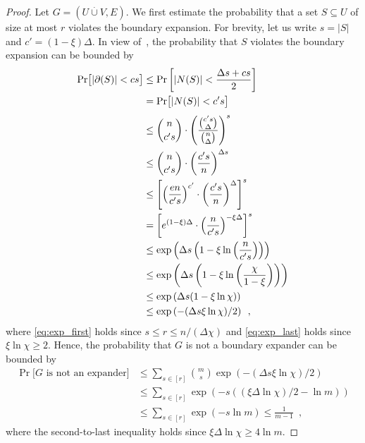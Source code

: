 \documentclass{article}
\newcommand{\PROB}[2][]{\Pr_{#1} \left[ #2 \right]}
\newcommand{\Prob}[2][]{\Pr_{#1} \bigl[ #2 \bigr]}
\newcommand{\boundary}[1]{\ensuremath{\partial #1}}
\newcommand{\setsize}[1]{\lvert#1\rvert}
\newcommand{\disjointunion}{\overset{.}{\cup}}
\newcommand{\eqcomma}{\enspace ,}
\newcommand{\numpigeons}{m}
\newcommand{\numholes}{n}
\newcommand{\uniqueNeigh}[2][]{\boundary_{{#1}} ({#2})}
\newcommand{\diff}{\xi}
\newcommand{\GdegMax}{\Delta}
\newcommand{\gdegmax}{\GdegMax}
\numberwithin{equation}{section}
\begin{document}
\begin{proof}
  Let $G= (U \disjointunion V, E)$. We 
  first estimate the probability 
  that a set $S \subseteq U$ of size at most $r$ violates 
  the boundary expansion. 
  For brevity, let us write
  $s = \setsize{ S }$
  and $c' = (1 - \diff)\GdegMax$.
  In view of~, 
  the probability that $S$ violates the boundary expansion
  can be bounded by
  \begin{subequations}
  \begin{align}
    \Prob{ \setsize{ \uniqueNeigh{S} } < cs } 
    &\le \PROB{ \setsize{ N(S) } < \frac{\GdegMax s + cs}{2}  }\\
    &= \Prob{ \setsize{ N(S) } < c's  }\\
    &\leq
      \binom{\numholes}{ c's } \cdot
      \left(
      \frac
      {\binom{c' s}{\gdegmax}}
      {\binom{\numholes}{\gdegmax}}
      \right)^s \\
    &\le  \binom{\numholes}{c's}  \cdot
    \left( \frac{ c's }{\numholes} \right)^{\GdegMax s}\\
    &\le 
     \left[
     \left( \frac{e\numholes}{c's} \right)^{c'} \cdot
     \left( \frac{c's}{\numholes} \right)^{\GdegMax}
     \right]^s
    \\
    &= 
    \left[
    {e}^{(1-\diff)\GdegMax} \cdot
    \left( \frac{\numholes}{c' s} \right)^{-\diff \GdegMax }
    \right]^s\\
    &\le \exp \left(\GdegMax s \left(1 -\diff \ln \left(\frac{\numholes}{c's}\right)\right) \right)\\ \label{eq:exp_first}
    &\le \exp \left(\GdegMax s \left(1 -\diff \ln \left(\frac{\chi}{1-\diff}\right)\right) \right)\\
    &\le \exp \left(\GdegMax s (1 -\diff \ln {\chi}) \right)\\ \label{eq:exp_last}
    &\le \exp \left(- (\GdegMax s \diff \ln {\chi}) /2 \right) \eqcomma
  \end{align}
  \end{subequations}
  where \eqref{eq:exp_first} holds since
    $
    s \leq r \leq \numholes / (\gdegmax \chi)
    $
    and
    \eqref{eq:exp_last} holds since $\diff \ln \chi \ge 2$.
  Hence, the probability that $G$ is not a boundary expander
  can be bounded by
  \begin{align}
\nonumber
    \Prob{G \text{ is not an expander}} &\le 
    \sum_{s \in [r]}\binom{\numpigeons}{s} \exp( - (\GdegMax s \diff \ln \chi)/2)\\
    &\le \sum_{s \in [r]} \exp (-s ((\diff \GdegMax \ln \chi)/2 - \ln
      \numpigeons))\\
\nonumber
    &\le \sum_{s \in [r]} \exp( -s \ln \numpigeons) \le \frac{1}{\numpigeons - 1} \eqcomma 
  \end{align}
where the second-to-last inequality holds since $\diff \GdegMax \ln \chi \ge 4 \ln \numpigeons$.
\end{proof}
\end{document}
